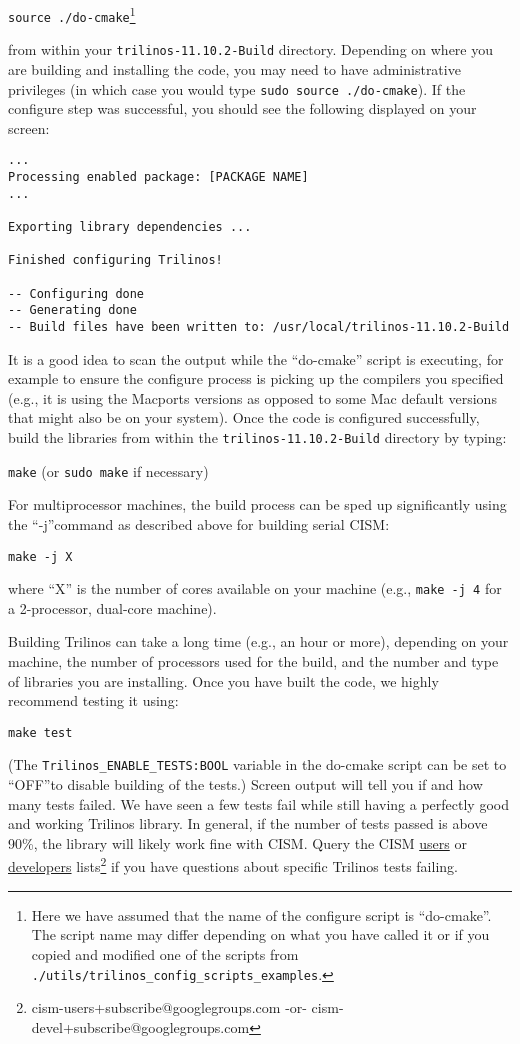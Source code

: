 \texttt{source ./do-cmake}\footnote{Here we have assumed that the name of the configure script is ``do-cmake''. The script name may differ depending on what you have called it or if you copied and modified one of the scripts from \texttt{./utils/trilinos\_config\_scripts\_examples}.}

\noindent
from within your \texttt{trilinos-11.10.2-Build} directory. Depending on where you are building and installing the code, you may need to have administrative privileges (in which case you would type \texttt{sudo source ./do-cmake}). If the configure step was successful, you should see the following displayed on your screen:

\begin{verbatim}
...
Processing enabled package: [PACKAGE NAME]
...

Exporting library dependencies ...

Finished configuring Trilinos!

-- Configuring done
-- Generating done
-- Build files have been written to: /usr/local/trilinos-11.10.2-Build
\end{verbatim}

It is a good idea to scan the output while the ``do-cmake'' script is executing, 
for example to ensure the configure process is picking up the compilers you specified 
(e.g., it is using the Macports versions as opposed to some Mac default versions that 
might also be on your system). Once the code is configured successfully, build the libraries 
from within the \texttt{trilinos-11.10.2-Build} directory by typing:

\texttt{make} (or \texttt{sudo make} if necessary) 

\noindent
For multiprocessor machines, the build process can be sped up significantly using 
the ``-j''command as described above for building serial CISM:

\texttt{make -j X}

\noindent
where ``X'' is the number of cores available on your machine (e.g., \texttt{make -j 4} 
for a 2-processor, dual-core machine).

Building Trilinos can take a long time (e.g., an hour or more), depending on your machine, 
the number of processors used for the build, and the number and type of libraries 
you are installing. Once you have built the code, we highly recommend testing it 
using:

 \texttt{make test} 

\noindent
(The \texttt{Trilinos\_ENABLE\_TESTS:BOOL}
variable in the do-cmake script can be set to ``OFF''to disable building of the tests.)
Screen output will tell you if and how many tests failed. We have seen 
a few tests fail while still having a perfectly good and working Trilinos library. 
In general, if the number of tests passed is above 90\%, the library will likely work fine with CISM.
Query the CISM \href{mailto:cism-users+subscribe@googlegroups.com}{users} or
\href{mailto:cism-devel+subscribe@googlegroups.com}{developers} lists\footnote{cism-users+subscribe@googlegroups.com -or- cism-devel+subscribe@googlegroups.com} 
if you have questions about specific Trilinos tests failing.

